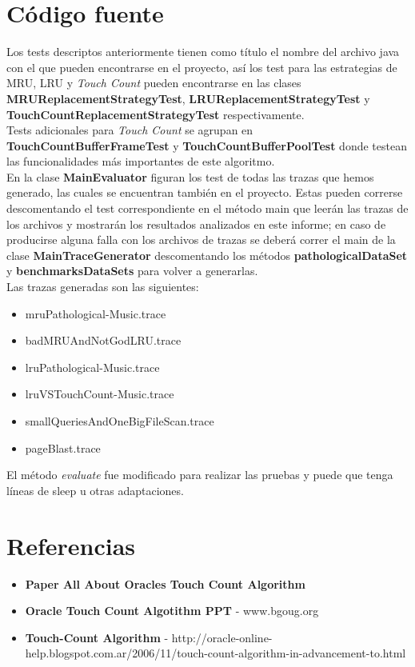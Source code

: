 \documentclass[11pt, a4paper, spanish]{article}
\begin{document}
\newpage
\section{C\'odigo fuente}

Los tests descriptos anteriormente tienen como t\'itulo el nombre del archivo java con el que pueden encontrarse en el proyecto, as\'i los test para las estrategias de MRU, LRU y \textit{Touch Count} pueden encontrarse en las clases \textbf{MRUReplacementStrategyTest}, \textbf{LRUReplacementStrategyTest} y \textbf{TouchCountReplacementStrategyTest} respectivamente.\\

Tests adicionales para \textit{Touch Count} se agrupan en \textbf{TouchCountBufferFrameTest} y \textbf{TouchCountBufferPoolTest}
donde testean las funcionalidades m\'as importantes de este algoritmo.\\
 
En la clase \textbf{MainEvaluator} figuran los test de todas las trazas que hemos generado, las cuales se encuentran tambi\'en en el proyecto. Estas pueden correrse descomentando el test correspondiente en el m\'etodo main que leer\'an las trazas de los archivos y mostrar\'an los resultados analizados en este informe; en caso de producirse alguna falla con los archivos de trazas se deber\'a correr el main de la clase \textbf{MainTraceGenerator} descomentando los m\'etodos \textbf{pathologicalDataSet} y \textbf{benchmarksDataSets} para volver a generarlas. \\

Las trazas generadas son las siguientes:

\begin{itemize}
	\item{mruPathological-Music.trace}
	\item{badMRUAndNotGodLRU.trace}
	\item{lruPathological-Music.trace}
	\item{lruVSTouchCount-Music.trace}
	\item{smallQueriesAndOneBigFileScan.trace}
	\item{pageBlast.trace}
\end{itemize}

El m\'etodo \textit{evaluate} fue modificado para realizar las pruebas y puede que tenga l\'ineas de sleep u otras adaptaciones.\\

\section{Referencias}

\begin{itemize}
	\item{\textbf{Paper All About Oracles Touch Count Algorithm}}
	\item{\textbf{Oracle Touch Count Algotithm PPT} - www.bgoug.org}
	\item{\textbf{Touch-Count Algorithm} - http://oracle-online-help.blogspot.com.ar/2006/11/touch-count-algorithm-in-advancement-to.html}
\end{itemize}
\end{document}
